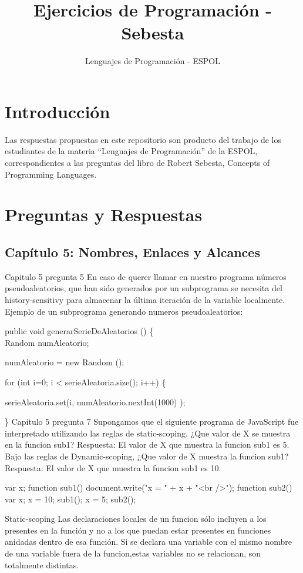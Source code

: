 \documentclass[12pt,oneside]{article}
\title{Ejercicios de Programación - Sebesta}
\author{Lenguajes de Programación - ESPOL}
\begin{document}
\maketitle

\section{Introducción}
Las respuestas propuestas en este repositorio son producto del trabajo de los estudiantes de la materia ``Lenguajes de Programación'' de la ESPOL, correspondientes a las preguntas del libro de Robert Sebesta, Concepts of Programming Languages.

\section{Preguntas y Respuestas}

\subsection{Capítulo 5: Nombres, Enlaces y Alcances}


Capitulo 5 pregunta 5
En caso de querer llamar en nuestro programa números pseudoaleatorios, que han sido generados por un subprograma se necesita del history-sensitivy para almacenar la última iteración de la variable localmente. 
Ejemplo de un subprograma generando numeros pseudoaleatorios:

 public void generarSerieDeAleatorios () \{  \\

        Random numAleatorio;

        numAleatorio = new Random ();

        for (int i=0; i < serieAleatoria.size(); i++)  \{

        serieAleatoria.set(i, numAleatorio.nextInt(1000) );

         \}
%
%
Capitulo 5 pregunta 7
Supongamos que el siguiente programa de JavaScript fue interpretado utilizando las reglas de static-scoping.
¿Que valor de X se muestra en la funcion sub1? 
Respuesta: El valor de X que muestra la funcion sub1 es 5.
Bajo las reglas  de Dynamic-scoping, ¿Que valor de X muestra la funcion sub1?
Respuesta: El valor de X que muestra la funcion sub1 es 10.

var x;
function sub1() {
document.write("x = " + x + "<br />");
}
function sub2() {
var x;
x = 10;
sub1();
}
x = 5;
sub2();

Static-scoping
 Las  declaraciones locales de un funcion sólo incluyen a los presentes en la función y no a los que puedan estar presentes en funciones anidadas  dentro de esa función.
 Si se declara una variable con el mismo nombre de una variable fuera de la funcion,estas variables no se relacionan, son totalmente distintas.
\end{document}

